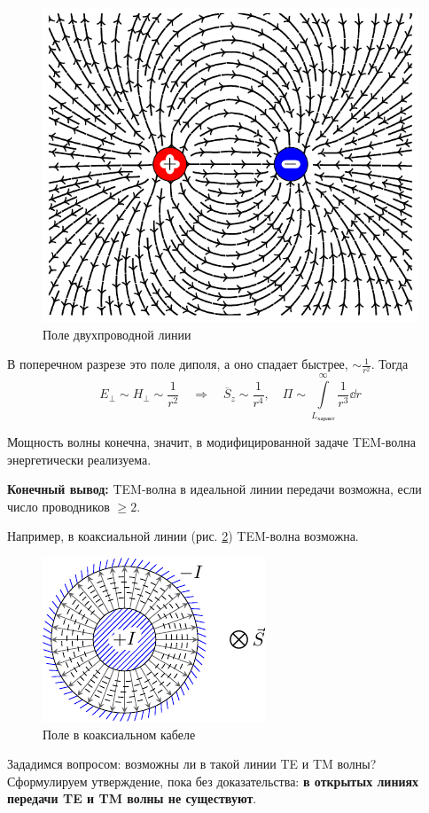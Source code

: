 \begin{figure}[h!]
	\centering
	\includegraphics[scale=0.7]{img/lect4_ris5}
	\caption{Поле двухпроводной линии}
	\label{fig:lect4:5}
\end{figure}

В поперечном разрезе это поле диполя, а оно спадает быстрее, $\sim \frac{1}{r^2}$. Тогда
\begin{equation*}
E_\perp\sim H_\perp \sim \frac{1}{r^2}
\quad \Rightarrow \quad
\overline{S}_z \sim \frac{1}{r^4}, \quad
\Pi \sim \int\limits_{L_\text{характ}}^\infty \frac{1}{r^3} \dd{r}
\end{equation*}

Мощность волны конечна, значит, в модифицированной задаче TEM-волна энергетически реализуема.

\textbf{Конечный вывод:} TEM-волна в идеальной линии передачи возможна, если число проводников $\geq 2$.

Например, в коаксиальной линии (рис. \ref{fig:lect4:6}) TEM-волна возможна.

\begin{figure}[h!]
	\centering
	\includegraphics[scale=1.5]{img/lect4_ris6}
	\caption{Поле в коаксиальном кабеле}
	\label{fig:lect4:6}
\end{figure}

Зададимся вопросом: возможны ли в такой линии TE и TM волны? Сформулируем утверждение, пока без доказательства:
\textbf{в открытых линиях передачи TE и TM волны не существуют}.
